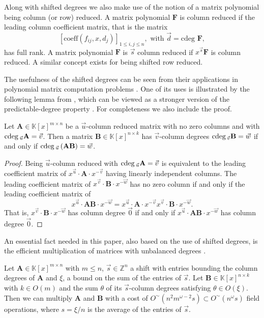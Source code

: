Along with shifted degrees we also make use of the notion of a matrix
polynomial being column (or row) reduced. A matrix polynomial $\mathbf{F}$
is column reduced if the leading column coefficient matrix, that is
the matrix 
\[
[\mbox{coeff}(f_{ij},x,d_{j})]_{1\leq i,j\leq n},\mbox{ with }\vec{d}=\mbox{cdeg }\mathbf{F},
\]
 has full rank. A matrix polynomial $\mathbf{F}$ is $\vec{s}$ column
reduced if $x^{\vec{s}}\mathbf{F}$ is column reduced. A similar concept
exists for being shifted row reduced.

The usefulness of the shifted degrees can be seen from their applications
in polynomial matrix computation problems \citep{ZL2012,za2012}.
One of its uses is illustrated by the following lemma from \citep[Chapter 2]{zhou:phd2012},
which can be viewed as a stronger version of the predictable-degree
property \citep[page 387]{kailath:1980}. For completeness we also
include the proof. 
\begin{lem}
\label{lem:predictableDegree} Let $\mathbf{A}\in\mathbb{K}\left[x\right]^{m\times n}$
be a $\vec{u}$-column reduced matrix with no zero columns and with
${\rm cdeg}\,_{\vec{u}}\mathbf{A}=\vec{v}$. Then a matrix $\mathbf{B}\in\mathbb{K}\left[x\right]^{n\times k}$
has $\vec{v}$-column degrees ${\rm cdeg}\,_{\vec{v}}\mathbf{B}=\vec{w}$
if and only if ${\rm cdeg}\,_{\vec{u}}\left(\mathbf{A}\mathbf{B}\right)=\vec{w}$. \end{lem}
\begin{proof}
Being $\vec{u}$-column reduced with ${\rm cdeg}\,_{\vec{u}}\mathbf{A}=\vec{v}$
is equivalent to the leading coefficient matrix of $x^{\vec{u}}\cdot\mathbf{A}\cdot x^{-\vec{v}}$
having linearly independent columns. The leading coefficient matrix
of $x^{\vec{v}}\cdot\mathbf{B}\cdot x^{-\vec{w}}$ has no zero column
if and only if the leading coefficient matrix of 
\[
x^{\vec{u}}\cdot\mathbf{AB}\cdot x^{-\vec{w}}=x^{\vec{u}}\cdot\mathbf{A}\cdot x^{-\vec{v}}x^{\vec{v}}\cdot\mathbf{B}\cdot x^{-\vec{w}}.
\]
 That is, $x^{\vec{v}}\cdot\mathbf{B}\cdot x^{-\vec{w}}$ has column
degree $\vec{0}$ if and only if $x^{\vec{u}}\cdot\mathbf{AB}\cdot x^{-\vec{w}}$
has column degree $\vec{0}$. 
\end{proof}
An essential fact needed in this paper, also based on the use of shifted
degrees, is the efficient multiplication of matrices with unbalanced
degrees \citep[Theorem 3.7]{za2012}. 
\begin{thm}
\label{thm:multiplyUnbalancedMatrices} Let $\mathbf{A}\in\mathbb{K}\left[x\right]^{m\times n}$
with $m\le n$, $\vec{s}\in\mathbb{Z}^{n}$ a shift with entries bounding
the column degrees of $\mathbf{A}$ and $\xi$, a bound on the sum
of the entries of $\vec{s}$. Let $\mathbf{B}\in\mathbb{K}\left[x\right]^{n\times k}$
with $k\in O\left(m\right)$ and the sum $\theta$ of its $\vec{s}$-column
degrees satisfying $\theta\in O\left(\xi\right)$. Then we can multiply
$\mathbf{A}$ and $\mathbf{B}$ with a cost of $O^{\sim}(n^{2}m^{\omega-2}s)\subset O^{\sim}(n^{\omega}s)$
field operations, where $s=\xi/n$ is the average of the entries of
$\vec{s}$. 
\end{thm}


